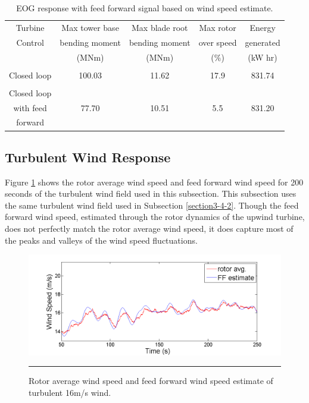 \begin{table}
\caption{EOG response with feed forward signal based on wind speed estimate.}
\centering
\begin{tabular}{ c | c c c c }
\hline
\hline
Turbine			& Max tower	base		& Max blade	root		& Max rotor				& Energy\\
Control			& bending moment		& bending moment		& over speed					& generated\\
						& (MNm)  				& (MNm)				& ($\%$)	& (kW hr)\\

\hline
  &  &   &  &  \\
Closed loop  & 100.03 & 11.62  &17.9 & 831.74 \\
 &  &   &  & \\
Closed loop  &  &   &  &  \\
with feed  & 77.70 & 10.51  & 5.5 & 831.20 \\
forward  &  &   &  &  \\
\hline
\hline
\end{tabular}
\label{Table3-4}
\end{table}

\subsection{Turbulent Wind Response} \label{section3-5-2}
Figure \ref{fig3-30} shows the rotor average wind speed and feed forward wind speed for 200 seconds of the turbulent wind field used in this subsection. This subsection uses the same turbulent wind field used in Subsection \ref{section3-4-2}. Though the feed forward wind speed, estimated through the rotor dynamics of the upwind turbine, does not perfectly match the rotor average wind speed, it does capture most of the peaks and valleys of the wind speed fluctuations. 

\begin{figure}[htbp]
	\centering
		\includegraphics[trim = {1cm 0 2cm 0}, clip, width = \linewidth]{Figures/ch3Figures/fig3-30.png}
		\rule{35em}{0.5pt}
	\caption{Rotor average wind speed and feed forward wind speed estimate of turbulent 16m/s wind.}
	\label{fig3-30}
\end{figure}

